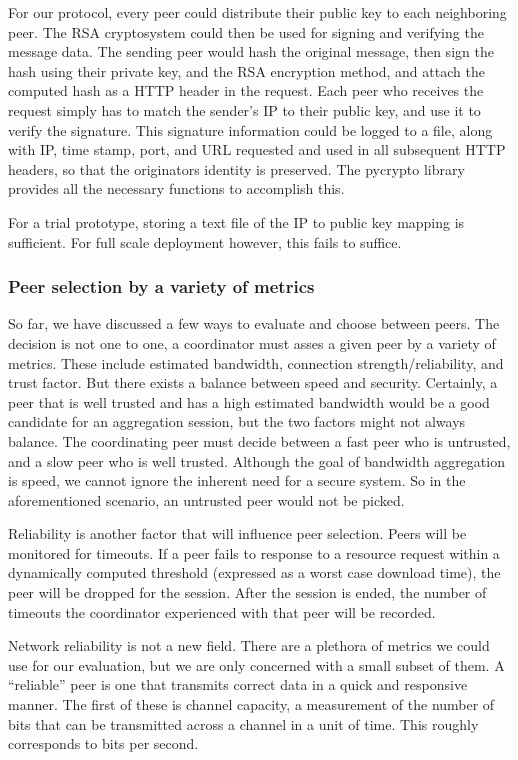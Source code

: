 \documentclass[12pt]{article}
\begin{document}
			For our protocol, every peer could distribute their public key to each neighboring peer. The RSA cryptosystem could then be used for signing and verifying the message data. The sending peer would hash the original message, then sign the hash using their private key, and the RSA encryption method, and attach the computed hash as a HTTP header in the request. Each peer who receives the request simply has to match the sender's IP to their public key, and use it to verify the signature. This signature information could be logged to a file, along with IP, time stamp, port, and URL requested and used in all subsequent HTTP headers, so that the originators identity is preserved. The pycrypto library provides all the necessary functions to accomplish this.

			For a trial prototype, storing a text file of the IP to public key mapping is sufficient. For full scale deployment however, this fails to suffice. 

		\subsubsection{Peer selection by a variety of metrics}

			So far, we have discussed a few ways to evaluate and choose between peers. The decision is not one to one, a coordinator must asses a given peer by a variety of metrics. These include estimated bandwidth, connection strength/reliability, and trust factor. But there exists a balance between speed and security. Certainly, a peer that is well trusted and has a high estimated bandwidth would be a good candidate for an aggregation session, but the two factors might not always balance. The coordinating peer must decide between a fast peer who is untrusted, and a slow peer who is well trusted. Although the goal of bandwidth aggregation is speed, we cannot ignore the inherent need for a secure system. So in the aforementioned scenario, an untrusted peer would not be picked.

			Reliability is another factor that will influence peer selection. Peers will be monitored for timeouts. If a peer fails to response to a resource request within a dynamically computed threshold (expressed as a worst case download time), the peer will be dropped for the session. After the session is ended, the number of timeouts the coordinator experienced with that peer will be recorded. 

			Network reliability is not a new field. There are a plethora of metrics we could use for our evaluation, but we are only concerned with a small subset of them. A ``reliable'' peer is one that transmits correct data in a quick and responsive manner. The first of these is channel capacity, a measurement of the number of bits that can be transmitted across a channel in a unit of time. This roughly corresponds to bits per second. 
\end{document}
